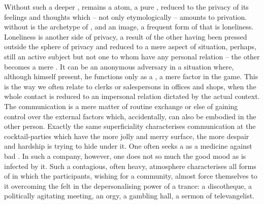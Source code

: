 Without such a deeper ,  remains a  atom,
a pure , reduced to the privacy of its  feelings and
thoughts which -- not only etymologically -- amounts to
privation.  without  is the archetype of , and an image, a frequent
 form of that is loneliness. Loneliness is another side of privacy, a
result of the other having been pressed outside the sphere of  privacy
and reduced to a mere aspect of  situation, perhaps, still an active
subject but not one to whom  have any personal relation -- the other
becomes a mere . It can be an anonymous adversary in a situation where,
although himself present, he functions only as a , a mere
factor in the  game.  This is the way we often relate to clerks or
salespersons in offices and shops, when the whole contact is reduced to an
impersonal relation dictated by the actual context. The communication is a mere
matter of routine exchange or else of gaining control over the external factors
which, accidentally, can also be embodied in the other person. Exactly the same
superficiality characterises communication at the cocktail-parties which have the
more jolly and merry surface, the more despair and hardship is trying to hide
under it. One often seeks a  as a medicine against bad
. In such a company, however, one does not so much  the good
mood as is infected by it. Such a contagious, often heavy, atmosphere
characterises all forms of  in which the participants, wishing for
a community, almost force themselves to  it overcoming the
felt  in the depersonalising power of a trance: a discotheque, a
politically agitating meeting, an orgy, a gambling hall, a sermon of
televangelist.

